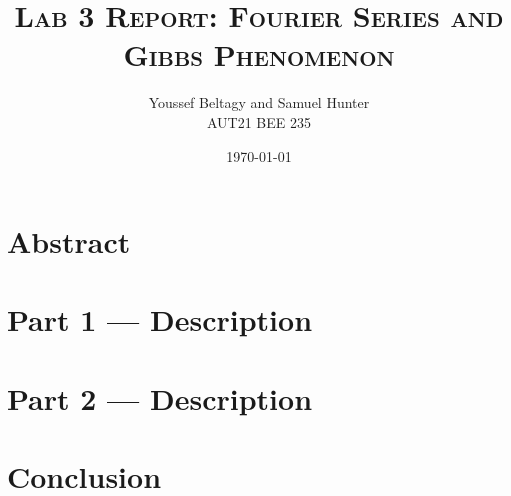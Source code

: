 \documentclass[11pt]{article}
\title{
    \textsc{Lab 3 Report: Fourier Series and Gibbs Phenomenon}
}
\author{
    \Large{Youssef Beltagy and Samuel Hunter} \\
    \large \textsc{AUT21 BEE 235}
}
\date{\today}
\begin{document}
\maketitle %
\pagebreak


\section{Abstract}


\section{Part 1 --- Description}


\pagebreak
\section{Part 2 --- Description}

\section{Conclusion}
\end{document}

